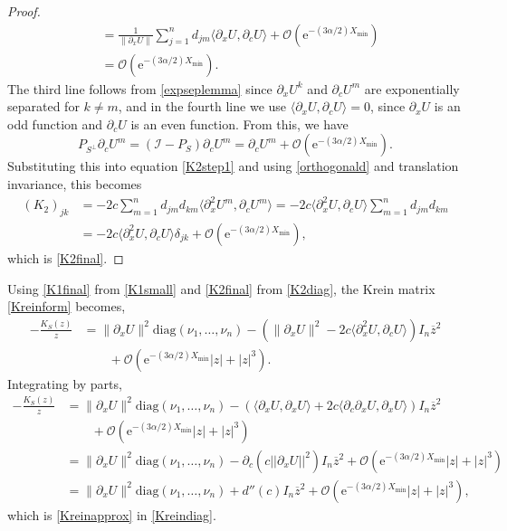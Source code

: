 \documentclass[review,onefignum,onetabnum]{siamart171218}
\newcommand{\rme}{\mathrm{e}}
\newcommand{\calI}{\mathcal{I}}
\newcommand{\vI}{\bm{\mathit{I}}}
\newcommand{\vK}{\bm{\mathit{K}}}
\begin{document}
\begin{proof}
\[\begin{aligned}
&= \frac{1}{\|\partial_x U\|} \sum_{j=1}^n d_{jm} \langle \partial_x U, \partial_c U \rangle + \mathcal{O}(\rme^{-(3 \alpha/2) X_{\mathrm{min}}}) \\
&= \mathcal{O}(\rme^{-(3 \alpha/2) X_{\mathrm{min}}}).
\end{aligned}
\]
The third line follows from \cref{expseplemma} since $\partial_x U^k$ and $\partial_c U^m$ are exponentially separated for $k \neq m$, and in the fourth line we use $\langle \partial_x U, \partial_c U \rangle = 0$, since $\partial_x U$ is an odd function and $\partial_c U$ is an even function. From this, we have
\[
P_{S^\perp} \partial_c U^m = (\calI - P_S) \partial_c U^m = \partial_c U^m + \mathcal{O}(\rme^{-(3 \alpha/2) X_{\mathrm{min}}}).
\]
Substituting this into equation \cref{K2step1} and using \cref{orthogonald} and translation invariance, this becomes
\[
\begin{aligned}
(\vK_2)_{jk}
&= -2 c \sum_{m = 1}^{n} d_{jm} d_{km} \langle \partial_x^2U^m, \partial_cU^m \rangle
= -2 c \langle \partial_x^2U, \partial_cU \rangle \sum_{m = 1}^{n} d_{jm} d_{km} \\
&= -2 c \langle \partial_x^2U,\partial_cU \rangle \delta_{jk} + \mathcal{O}(\rme^{-(3 \alpha/2) X_{\mathrm{min}}}),
\end{aligned}
\]
which is \cref{K2final}.
\end{proof}

Using \cref{K1final} from \cref{K1small} and \cref{K2final} from \cref{K2diag}, the Krein matrix \cref{Kreinform} becomes,
\[%
\begin{aligned}
-\frac{\vK_S(z)}{z}&= \|\partial_xU\|^2 \text{diag}(\nu_1, \dots, \nu_n)
- ( \|\partial_xU\|^2 -2 c \langle \partial_x^2U, \partial_cU \rangle) \vI_n \overline{z}^2 \\
&\qquad + \mathcal{O}(\rme^{-(3 \alpha/2) X_{\mathrm{min}}}|z| + |z|^3).
\end{aligned}
\]%
Integrating by parts,
\[
\begin{aligned}
-\frac{\vK_S(z)}{z}
&= \|\partial_xU\|^2 \text{diag}(\nu_1, \dots, \nu_n) - \left( \langle \partial_xU, \partial_xU \rangle + 2c\langle \partial_c\partial_xU, \partial_xU\rangle \right)\vI_n\overline{z}^2\\
&\qquad + \mathcal{O}(\rme^{-(3 \alpha/2) X_{\mathrm{min}}}|z| + |z|^3)  \\
&= \|\partial_xU\|^2 \text{diag}(\nu_1, \dots, \nu_n) -\partial_c\left( c||\partial_xU||^2 \right) \vI_n \overline{z}^2  + \mathcal{O}(\rme^{-(3 \alpha/2) X_{\mathrm{min}}}|z| + |z|^3) \\
&= \|\partial_xU\|^2 \text{diag}(\nu_1, \dots, \nu_n) + d''(c) \vI_n \overline{z}^2  + \mathcal{O}(\rme^{-(3 \alpha/2) X_{\mathrm{min}}}|z| + |z|^3),
\end{aligned}
\]
which is \cref{Kreinapprox} in \cref{Kreindiag}.
\end{document}

